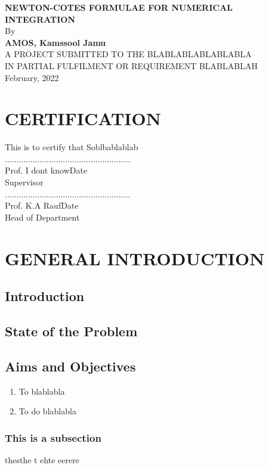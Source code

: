 \documentclass[12pt]{report}
\begin{document}
	
	\begin{titlepage}
		\centering \Large \textbf{NEWTON-COTES FORMULAE FOR NUMERICAL INTEGRATION}\\
		\vspace{2cm}
		By
		\\[1cm]
		\textbf{AMOS, Kamssool Jamu}
		\\[1cm]
		 A PROJECT SUBMITTED TO THE BLABLABLABLABLABLA		 
		 \\[1cm]
		 IN PARTIAL FULFILMENT OR REQUIREMENT BLABLABLAH		 
		 \\[0.8cm]
		 
		 February, 2022
	\end{titlepage}
	\chapter*{\centering CERTIFICATION}
	This is to certify that Soblbablablab\\[1.7cm]
	
	\noindent........................\hspace{8cm}..............................\\
	Prof. I dont know\hspace{8.5cm}Date\\
	Supervisor\\[1.7cm]
	
	\noindent........................\hspace{8cm}..............................\\
	Prof. K.A Rauf\hspace{8.8cm}Date\\
	Head of Department\\[2cm]
	
	\tableofcontents
	\newpage
	\chapter{ GENERAL INTRODUCTION}
	
	\section{Introduction}
	\blindtext
	
	\section{State of the Problem}
	\blindtext
	
	\section{Aims and Objectives}
	\begin{enumerate}
		\item To blablabla
		\item To do blablabla
	\end{enumerate}
	
	\subsection{This is a subsection}
	thesthe t ehte eerere
	
\end{document}
